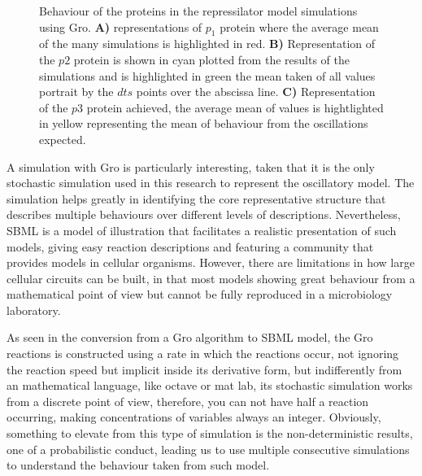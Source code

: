 \documentclass[12pt]{article}
\begin{document}
\begin{center}
    \begin{figure}[h]
        
        
        
    
        Behaviour of the proteins in the repressilator model simulations using Gro. \textbf{A)} representations of $p_{1}$ protein where the average mean of the many simulations is highlighted in red. \textbf{B)} Representation of the $p2$ protein is shown in cyan plotted from the results of the simulations and is highlighted in green the mean taken of all values portrait by the $dts$ points over the abscissa line. \textbf{C)} Representation of the $p3$ protein achieved, the average mean of values is hightlighted in yellow representing the mean of behaviour from the oscillations expected.
    \end{figure}
\end{center}

A simulation with Gro is particularly interesting, taken that it is the only stochastic simulation used in this research to represent the oscillatory model. The simulation helps greatly in identifying the core representative structure that describes multiple behaviours over different levels of descriptions. Nevertheless, SBML is a model of illustration that facilitates a realistic presentation of such models, giving easy reaction descriptions and featuring a community that provides models in cellular organisms. However, there are limitations in how large cellular circuits can be built, in that most models showing great behaviour from a mathematical point of view but cannot be fully reproduced in a microbiology laboratory.

As seen in the conversion from a Gro algorithm to SBML model, the Gro reactions is constructed using a rate in which the reactions occur, not ignoring the reaction speed but implicit inside its derivative form, but indifferently from an mathematical language, like octave or mat lab, its stochastic simulation works from a discrete point of view, therefore, you can not have half a reaction occurring, making concentrations of variables always an integer. Obviously, something to elevate from this type of simulation is the non-deterministic results, one of a probabilistic conduct, leading us to use multiple consecutive simulations to understand the behaviour taken from such model.
\end{document}
